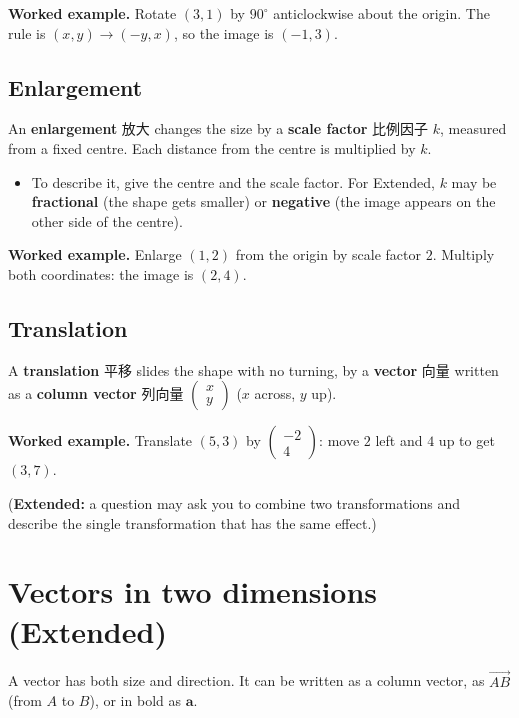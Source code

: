 \documentclass[11pt]{article}
\begin{document}
\textbf{Worked example.} Rotate $(3, 1)$ by $90^{\circ}$ anticlockwise about the origin. The rule is $(x, y) \to (-y, x)$, so the image is $(-1, 3)$.

\subsection*{Enlargement}

An \textbf{enlargement} 放大 changes the size by a \textbf{scale factor} 比例因子 $k$, measured from a fixed centre. Each distance from the centre is multiplied by $k$.

\begin{itemize}
\item To describe it, give the centre and the scale factor. For Extended, $k$ may be \textbf{fractional} (the shape gets smaller) or \textbf{negative} (the image appears on the other side of the centre).

\end{itemize}

\textbf{Worked example.} Enlarge $(1, 2)$ from the origin by scale factor $2$. Multiply both coordinates: the image is $(2, 4)$.

\subsection*{Translation}

A \textbf{translation} 平移 slides the shape with no turning, by a \textbf{vector} 向量 written as a \textbf{column vector} 列向量 $\begin{pmatrix} x \\ y \end{pmatrix}$ ($x$ across, $y$ up).

\textbf{Worked example.} Translate $(5, 3)$ by $\begin{pmatrix} -2 \\ 4 \end{pmatrix}$: move $2$ left and $4$ up to get $(3, 7)$.

(\textbf{Extended:} a question may ask you to combine two transformations and describe the single transformation that has the same effect.)

\section*{Vectors in two dimensions (Extended)}

A vector has both size and direction. It can be written as a column vector, as $\overrightarrow{AB}$ (from $A$ to $B$), or in bold as $\mathbf{a}$.
\end{document}
